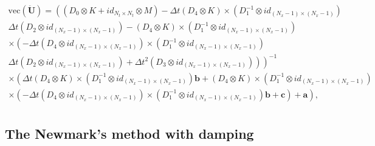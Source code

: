 \documentclass{ws-m3as}
\begin{document}
$$
\begin{array}{c}
\mathrm{vec}(\ddot{\mathbf{U}}) = \left(\left(D_0 \otimes K + id_{N_t \times N_t} \otimes  M  \right) - \Delta t \left(D_4 \otimes  K \right) \times \left( D_1^{-1} \otimes  id_{(N_x-1)\times(N_x-1)}\right)   \right.\\
\left. \Delta t \left( D_2 \otimes  id_{(N_x-1)\times(N_x-1)}\right) -  \left( D_4 \otimes   K\right) \times \left( D_1^{-1} \otimes  id_{(N_x-1)\times(N_x-1)}\right) \right. \\
\left.  \times \left( - \Delta t \left(D_4 \otimes  id_{(N_x-1)\times(N_x-1)} \right) \times \left( D_1^{-1} \otimes  id_{(N_x-1)\times(N_x-1)}\right) \right. \right. \\
\left. \left. \Delta t \left( D_2 \otimes  id_{(N_x-1)\times(N_x-1)}\right)  + \Delta t^2 \left( D_3 \otimes  id_{(N_x-1)\times(N_x-1)} \right) \right) \right)^{-1} \\
\times \left( \Delta t \left(D_4 \otimes  K \right) \times \left( D_1^{-1} \otimes  id_{(N_x-1)\times(N_x-1)}\right)  \mathbf{b} +\left( D_4 \otimes   K\right) \times \left( D_1^{-1} \otimes  id_{(N_x-1)\times(N_x-1)}\right) \right. \\
\left.  \times \left( - \Delta t \left(D_4 \otimes  id_{(N_x-1)\times(N_x-1)} \right) \times \left( D_1^{-1} \otimes  id_{(N_x-1)\times(N_x-1)}\right) \mathbf{b}  + \mathbf{c}  \right) + \mathbf{a}  \right), \\
\end{array}
$$





\subsection{The Newmark's method with damping}
\end{document}
